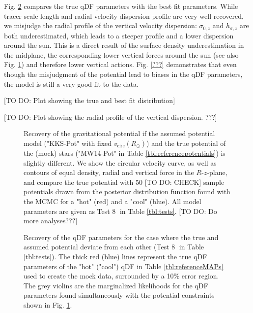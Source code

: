 
Fig. \ref{fig:MW14vsKKS2SphFlex_violins} compares the true qDF parameters with the best fit parameters. While tracer scale length and radial velocity dispersion profile are very well recovered, we misjudge the radial profile of the vertical velocity dispersion: $\sigma_{0,z}$ and $h_{\sigma,z}$ are both underestimated, which leads to a steeper profile and a lower dispersion around the sun. This is a direct result of the surface density underestimation in the midplane, the corresponding lower vertical forces around the sun (see also Fig. \ref{fig:MW14vsKKS2SphFlex}) and therefore lower vertical actions. Fig. \ref{???} demonstrates that even though the misjudgment of the potential lead to biases in the qDF parameters, the model is still a very good fit to the data.


[TO DO: Plot showing the true and best fit distribution]

[TO DO: Plot showing the radial profile of the vertical dispersion. ???]








\begin{figure}
\caption{Recovery of the gravitational potential if the assumed potential model ("KKS-Pot" with fixed $v_\text{circ}(R_\odot)$) and the true potential of the (mock) stars ("MW14-Pot" in Table \ref{tbl:referencepotentials}) is slightly different. We show the circular velocity curve, as well as contours of equal density, radial and vertical force in the $R$-$z$-plane, and compare the true potential with 50 [TO DO: CHECK] sample potentials drawn from the posterior distribution function found with the MCMC for a "hot" (red) and a "cool" \MAP (blue). All model parameters are given as Test \textcircled{8} in Table \ref{tbl:tests}. [TO DO: Do more analyses???]}
\label{fig:MW14vsKKS2SphFlex}
\end{figure}

\begin{figure}
\caption{Recovery of the qDF parameters for the case where the true and assumed potential deviate from each other (Test \textcircled{8} in Table \ref{tbl:tests}). The thick red (blue) lines represent the true qDF parameters of the "hot" ("cool") qDF in Table \ref{tbl:referenceMAPs} used to create the mock data, surrounded by a 10\% error region. The grey violins are the marginalized likelihoods for the qDF parameters found simultaneously with the potential constraints shown in Fig. \ref{fig:MW14vsKKS2SphFlex}.}
\label{fig:MW14vsKKS2SphFlex_violins}
\end{figure}

